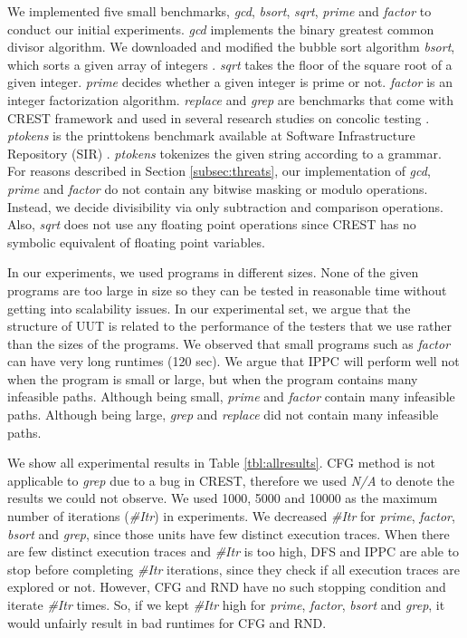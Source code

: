 \documentclass[EPiCempty]{easychair}
\begin{document}
We implemented five small benchmarks, \emph{gcd}, \emph{bsort}, \emph{sqrt}, \emph{prime} and \emph{factor} to conduct our initial experiments. \emph{gcd} implements the binary greatest common divisor algorithm. We downloaded and modified the bubble sort algorithm \emph{bsort}, which sorts a given array of integers \cite{website:bubblesort}. \emph{sqrt} takes the floor of the square root of a given integer. \emph{prime} decides whether a given integer is prime or not. \emph{factor} is an integer factorization algorithm. \emph{replace} and \emph{grep} are benchmarks that come with CREST framework and used in several research studies on concolic testing \cite{Burnim:2008:HSD:1642931.1642995, Dong:2011:AHB:2056316.2057002, Seo:2014}. \emph{ptokens} is the printtokens  benchmark available at Software Infrastructure Repository (SIR) \cite{SIR}. \emph{ptokens} tokenizes the given string according to a grammar. For reasons described in Section \ref{subsec:threats}, our implementation of \emph{gcd}, \emph{prime} and \emph{factor} do not contain any bitwise masking or modulo operations. Instead, we decide divisibility via only subtraction and comparison operations. Also, \emph{sqrt} does not use any floating point operations since CREST has no symbolic equivalent of floating point variables.

In our experiments, we used programs in different sizes. None of the given programs are too large in size so they can be tested in reasonable time without getting into scalability issues. In our experimental set, we argue that the structure of UUT is related to the performance of the testers that we use rather than the sizes of the programs. We observed that small programs such as \emph{factor} can have very long runtimes (120 sec). We argue that IPPC will perform well not when the program is small or large, but when the program contains many infeasible paths. Although being small, \emph{prime} and \emph{factor} contain many infeasible paths. Although being large, \emph{grep} and \emph{replace} did not contain many infeasible paths.

We show all experimental results in Table \ref{tbl:allresults}. CFG method is not applicable to \emph{grep} due to a bug in CREST, therefore we used \emph{N/A} to denote the results we could not observe. We used 1000, 5000 and 10000 as the maximum number of iterations (\emph{{\#}Itr}) in experiments. We decreased \emph{{\#}Itr} for \emph{prime}, \emph{factor}, \emph{bsort} and \emph{grep}, since those units have few distinct execution traces. When there are few distinct execution traces and \emph{{\#}Itr} is too high, DFS and IPPC are able to stop before completing \emph{{\#}Itr} iterations, since they check if all execution traces are explored or not. However, CFG and RND have no such stopping condition and iterate \emph{{\#}Itr} times. So, if we kept \emph{{\#}Itr} high for \emph{prime}, \emph{factor}, \emph{bsort} and \emph{grep}, it would unfairly result in bad runtimes for CFG and RND.
\end{document}
